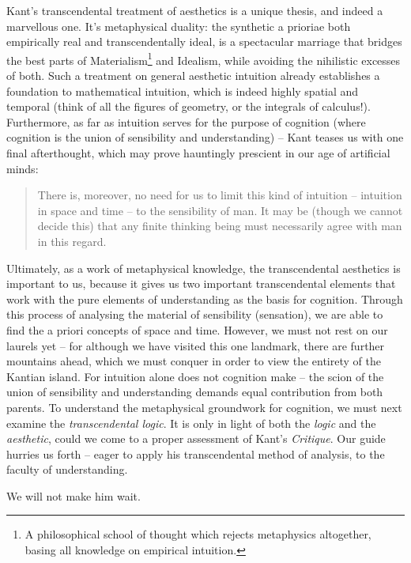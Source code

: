 Kant's transcendental treatment of aesthetics is a unique thesis, and indeed a marvellous one. It's metaphysical duality: the synthetic a prioriae both empirically real and transcendentally ideal, is a spectacular marriage that bridges the best parts of Materialism\footnote{A philosophical school of thought which rejects metaphysics altogether, basing all knowledge on empirical intuition.} and Idealism, while avoiding the nihilistic excesses of both. Such a treatment on general aesthetic intuition already establishes a foundation to mathematical intuition, which is indeed highly spatial and temporal (think of all the figures of geometry, or the integrals of calculus!). Furthermore, as far as intuition serves for the purpose of cognition (where cognition is the union of sensibility and understanding) -- Kant teases us with one final afterthought, which may prove hauntingly prescient in our age of artificial minds:

\begin{quote}
  There is, moreover, no need for us to limit this kind of intuition -- intuition in space and time -- to the sensibility of man. It may be (though we cannot decide this) that any finite thinking being must necessarily agree with man in this regard.

  \autocite[B72]{hackett}
\end{quote}

\noindent
Ultimately, as a work of metaphysical knowledge, the transcendental aesthetics is important to us, because it gives us two important transcendental elements that work with the pure elements of understanding as the basis for cognition. Through this process of analysing the material of sensibility (sensation), we are able to find the a priori concepts of space and time. However, we must not rest on our laurels yet -- for although we have visited this one landmark, there are further mountains ahead, which we must conquer in order to view the entirety of the Kantian island. For intuition alone does not cognition make -- the scion of the union of sensibility and understanding demands equal contribution from both parents. To understand the metaphysical groundwork for cognition, we must next examine the \emph{transcendental logic}. It is only in light of both the \emph{logic} and the \emph{aesthetic}, could we come to a proper assessment of Kant's \emph{Critique}. Our guide hurries us forth -- eager to apply his transcendental method of analysis, to the faculty of understanding.

\noindent
We will not make him wait.


